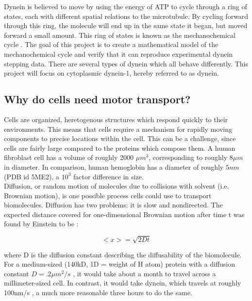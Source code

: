 \documentclass[
11pt, %
english, %
singlespacing, %
headsepline, %
chapterinoneline, %
]{MastersDoctoralThesis} %
\begin{document}
Dynein is believed to move by using the energy of ATP to cycle through a ring of states, each with different spatial relations to the microtubule. By cycling forward through this ring, the molecule will end up in the same state it began, but moved forward a small amount. This ring of states is known as the mechanochemical cycle \cite{cianfroccoreview}. The goal of this project is to create a mathematical model of the mechanochemical cycle and verify that it can reproduce experimental dynein stepping data. There are several types of dynein which all behave differently. This project will focus on cytoplasmic dynein-1, hereby referred to as dynein.\\

\subsection{Why do cells need motor transport?}
Cells are organized, heretogenous structures which respond quickly to their environments. This means that cells require a mechanism for rapidly moving components to precise locations within the cell. This can be a challenge, since cells are fairly large compared to the proteins which compose them. A human fibroblast cell has a volume of roughly 2000 $\mu m^3$\cite{fibroblastvolume}, corresponding to roughly $8 \mu m$ in diameter. In comparison, human hemoglobin has a diameter of roughly $5 nm$ (PDB id 5ME2), a $10^3$ factor difference in size.\\

Diffusion, or random motion of molecules due to collisions with solvent (i.e. Brownian motion), is one possible process cells could use to transport biomolecules. Diffusion has two problems: it is slow and nondirected. The expected distance covered for one-dimensional Brownian motion after time t was found by Einstein to be \cite{einstein-paper}:

\begin{equation}
  \label{diffusion-equation}
  <x> = \sqrt{2Dt}
\end{equation}

where D is the diffusion constant describing the diffusability of the biomolecule. For a medium-sized (140kD, 1D = weight of H atom) protein with a diffusion constant $D = .2 \mu m^2/s$ \cite{diffusionconstants}, it would take about a month to travel across a millimeter-sized cell. In contrast, it would take dynein, which travels at roughly 100nm/s \cite{weihongpaper}, a much more reasonable three hours to do the same. \\%
\end{document}
